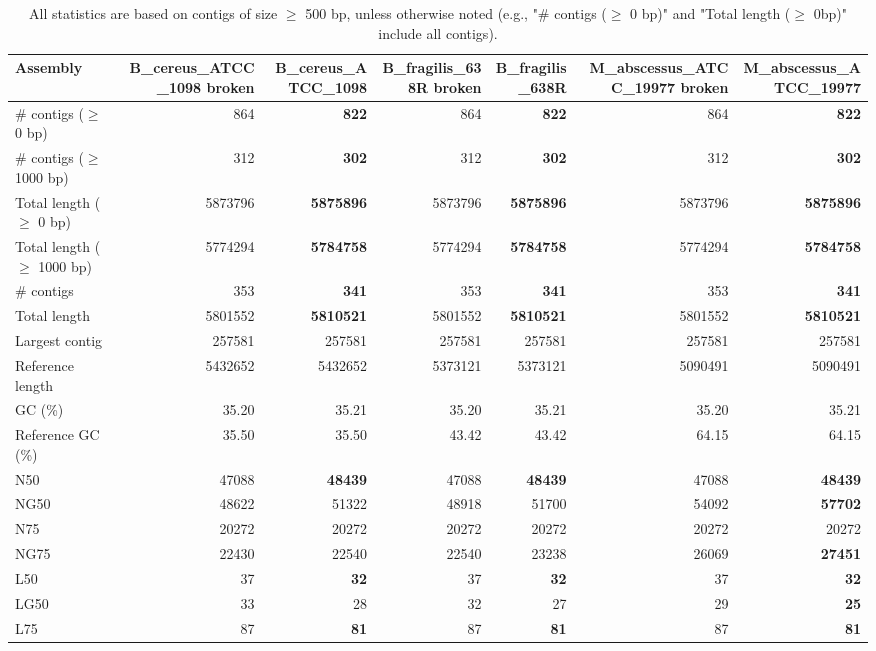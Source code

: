 \documentclass[12pt,a4paper]{article}
\begin{document}
\begin{table}[ht]
\begin{center}
\caption{All statistics are based on contigs of size $\geq$ 500 bp, unless otherwise noted (e.g., "\# contigs ($\geq$ 0 bp)" and "Total length ($\geq$ 0bp)" include all contigs).}
\begin{tabular}{|l*{6}{|r}|}
\hline
Assembly & B\_cereus\_ATCC\_1098 broken & B\_cereus\_ATCC\_1098 & B\_fragilis\_638R broken & B\_fragilis\_638R & M\_abscessus\_ATCC\_19977 broken & M\_abscessus\_ATCC\_19977 \\ \hline
\# contigs ($\geq$ 0 bp) & 864 & {\bf 822} & 864 & {\bf 822} & 864 & {\bf 822} \\ \hline
\# contigs ($\geq$ 1000 bp) & 312 & {\bf 302} & 312 & {\bf 302} & 312 & {\bf 302} \\ \hline
Total length ($\geq$ 0 bp) & 5873796 & {\bf 5875896} & 5873796 & {\bf 5875896} & 5873796 & {\bf 5875896} \\ \hline
Total length ($\geq$ 1000 bp) & 5774294 & {\bf 5784758} & 5774294 & {\bf 5784758} & 5774294 & {\bf 5784758} \\ \hline
\# contigs & 353 & {\bf 341} & 353 & {\bf 341} & 353 & {\bf 341} \\ \hline
Total length & 5801552 & {\bf 5810521} & 5801552 & {\bf 5810521} & 5801552 & {\bf 5810521} \\ \hline
Largest contig & 257581 & 257581 & 257581 & 257581 & 257581 & 257581 \\ \hline
Reference length & 5432652 & 5432652 & 5373121 & 5373121 & 5090491 & 5090491 \\ \hline
GC (\%) & 35.20 & 35.21 & 35.20 & 35.21 & 35.20 & 35.21 \\ \hline
Reference GC (\%) & 35.50 & 35.50 & 43.42 & 43.42 & 64.15 & 64.15 \\ \hline
N50 & 47088 & {\bf 48439} & 47088 & {\bf 48439} & 47088 & {\bf 48439} \\ \hline
NG50 & 48622 & 51322 & 48918 & 51700 & 54092 & {\bf 57702} \\ \hline
N75 & 20272 & 20272 & 20272 & 20272 & 20272 & 20272 \\ \hline
NG75 & 22430 & 22540 & 22540 & 23238 & 26069 & {\bf 27451} \\ \hline
L50 & 37 & {\bf 32} & 37 & {\bf 32} & 37 & {\bf 32} \\ \hline
LG50 & 33 & 28 & 32 & 27 & 29 & {\bf 25} \\ \hline
L75 & 87 & {\bf 81} & 87 & {\bf 81} & 87 & {\bf 81} \\ \hline

\end{tabular}
\end{center}
\end{table}
\end{document}
